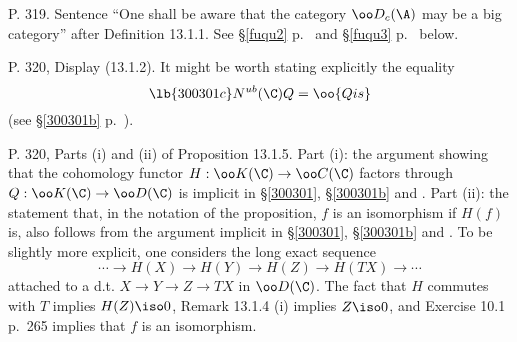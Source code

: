 \documentclass[12pt]{article}
\theoremstyle{remark}
\theoremstyle{definition}
\begin{document}
%

\begin{s}
P. 319. Sentence ``One shall be aware that the category $\oo D_c(\A)$ may be a big category'' after Definition 13.1.1. See \S\ref{fuqu2} p.~ and \S\ref{fuqu3} p.~ below.

\end{s}

%


\begin{s}
P. 320, Display (13.1.2). It might be worth stating explicitly the equality 
\begin{equation}\lb{300301c}
N^{ub}(\C)Q=\oo{Qis}
\end{equation}
(see \S\ref{300301b} p.~).
\end{s}

%

\begin{s}
P. 320, Parts (i) and (ii) of Proposition 13.1.5. Part (i): the argument showing that the cohomology functor $H:\oo K(\C)\to\oo C(\C)$ factors through $Q:\oo K(\C)\to\oo D(\C)$ is implicit in \S\ref{300301}, \S\ref{300301b} and . Part (ii): the statement that, in the notation of the proposition, $f$ is an isomorphism if $H(f)$ is, also follows from the argument implicit in \S\ref{300301}, \S\ref{300301b} and . To be slightly more explicit, one considers the long exact sequence 
$$
\cdots\to H(X)\to H(Y)\to H(Z)\to H(TX)\to\cdots
$$ 
attached to a d.t. $X\to Y\to Z\to TX$ in $\oo D(\C)$. The fact that $H$ commutes with $T$ implies $H(Z)\iso0$, Remark 13.1.4 (i) implies $Z\iso0$, and Exercise 10.1 p.~265 implies that $f$ is an isomorphism.
\end{s}
\end{document}
